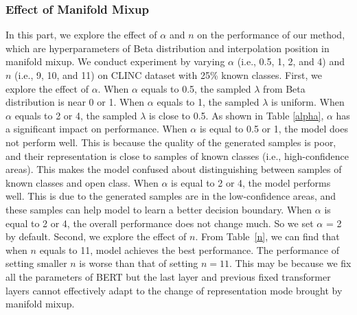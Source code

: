 \documentclass[journal]{IEEEtran}
\begin{document}

\subsubsection{Effect of Manifold Mixup}
In this part, we explore the effect of $\alpha$ and $n$ on the performance of our method, which are hyperparameters of Beta distribution and interpolation position in manifold mixup.
We conduct experiment by varying $\alpha$ (i.e., 0.5, 1, 2, and 4) and $n$ (i.e., 9, 10, and 11) on CLINC dataset with 25\% known classes.
First, we explore the effect of $\alpha$.
When $\alpha$ equals to 0.5, the sampled $\lambda$ from Beta distribution is near 0 or 1.
When $\alpha$ equals to 1, the sampled $\lambda$ is uniform.
When $\alpha$ equals to 2 or 4, the sampled $\lambda$ is close to 0.5.
As shown in Table \ref{alpha}, $\alpha$ has a significant impact on performance.
When $\alpha$ is equal to 0.5 or 1, the model does not perform well.
This is because the quality of the generated samples is poor, and their representation is close to samples of known classes (i.e., high-confidence areas).
This makes the model confused about distinguishing between samples of known classes and open class. 
When $\alpha$ is equal to 2 or 4, the model performs well.
This is due to the generated samples are in the low-confidence areas, and these samples can help model to learn a better decision boundary.
When $\alpha$ is equal to 2 or 4, the overall performance does not change much.
So we set $\alpha$ = 2 by default.
Second, we explore the effect of $n$.
From Table~\ref{n}, we can find that when $n$ equals to 11, model achieves the best performance.
The performance of setting smaller $n$ is worse than that of setting $n=11$.
This may be because we fix all the parameters of BERT but the last layer and previous fixed transformer layers cannot effectively adapt to the change of representation mode brought by manifold mixup.
\end{document}
